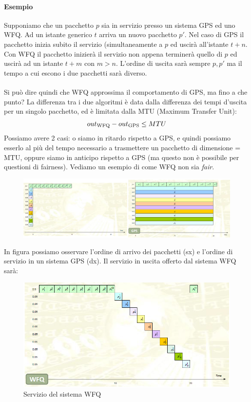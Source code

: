 \documentclass{article}
\begin{document}
\paragraph{Esempio} Supponiamo che un pacchetto \(p\) sia in servizio presso un sistema GPS ed uno WFQ. Ad un istante generico \(t\) arriva un nuovo pacchetto \(p'\). Nel caso di GPS il pacchetto inizia subito il servizio (simultaneamente a \(p\) ed uscirà all'istante \(t+n\). Con WFQ il pacchetto inizierà il servizio non appena terminerà quello di \(p\) ed uscirà ad un istante \(t+m\) con \( m>n\). L'ordine di uscita sarà sempre \(p, p'\) ma il tempo a cui escono i due pacchetti sarà diverso.\\ \\
Si può dire quindi che WFQ approssima il comportamento di GPS, ma fino a che punto? La differenza tra i due algoritmi è data dalla differenza dei tempi d'uscita per un singolo pacchetto, ed è limitata dalla MTU (Maximum Transfer Unit):
\[ out\textsubscript{WFQ} - out\textsubscript{GPS} \leq MTU \]
Possiamo avere 2 casi: o siamo in ritardo rispetto a GPS, e quindi possiamo esserlo al più del tempo necessario a trasmettere un pacchetto di dimensione = MTU, oppure siamo in anticipo rispetto a GPS (ma questo non è possibile per questioni di fairness). Vediamo un esempio di come WFQ non sia \textit{fair}.
\begin{figure}[H]
    \centering
    \includegraphics[scale=1.1]{figures/fairness1.jpg}
    \caption{}
\end{figure}
In figura possiamo osservare l'ordine di arrivo dei pacchetti (sx) e l'ordine di servizio in un sistema GPS (dx). Il servizio in uscita offerto dal sistema WFQ sarà:
\begin{figure}[H]
    \centering
    \includegraphics[scale=1.7]{figures/fairness2.jpg}
    \caption{Servizio del sistema WFQ}
\end{figure}
\end{document}
